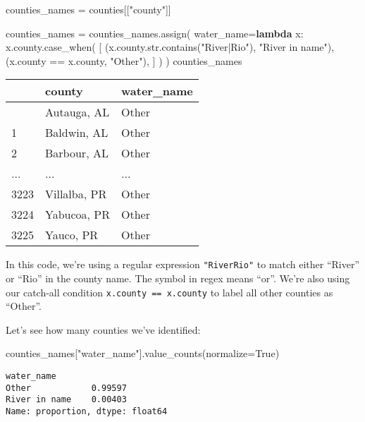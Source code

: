 \documentclass[
  letterpaper,
  DIV=11,
  numbers=noendperiod]{scrreprt}
\newenvironment{Shaded}{\begin{snugshade}}{\end{snugshade}}
\newcommand{\BuiltInTok}[1]{\textcolor[rgb]{0.00,0.23,0.31}{#1}}
\newcommand{\KeywordTok}[1]{\textcolor[rgb]{0.00,0.23,0.31}{\textbf{#1}}}
\newcommand{\NormalTok}[1]{\textcolor[rgb]{0.00,0.23,0.31}{#1}}
\newcommand{\OperatorTok}[1]{\textcolor[rgb]{0.37,0.37,0.37}{#1}}
\newcommand{\StringTok}[1]{\textcolor[rgb]{0.13,0.47,0.30}{#1}}
\newcommand{\VariableTok}[1]{\textcolor[rgb]{0.07,0.07,0.07}{#1}}
\begin{document}
\begin{Shaded}
\begin{Highlighting}[]
\NormalTok{counties\_names }\OperatorTok{=}\NormalTok{ counties[[}\StringTok{"county"}\NormalTok{]]}

\NormalTok{counties\_names }\OperatorTok{=}\NormalTok{ counties\_names.assign(}
\NormalTok{    water\_name}\OperatorTok{=}\KeywordTok{lambda}\NormalTok{ x: x.county.case\_when(}
\NormalTok{        [}
\NormalTok{            (x.county.}\BuiltInTok{str}\NormalTok{.contains(}\StringTok{"River|Rio"}\NormalTok{), }\StringTok{"River in name"}\NormalTok{),}
\NormalTok{            (x.county }\OperatorTok{==}\NormalTok{ x.county, }\StringTok{"Other"}\NormalTok{),}
\NormalTok{        ]}
\NormalTok{    )}
\NormalTok{)}
\NormalTok{counties\_names}
\end{Highlighting}
\end{Shaded}

\begin{longtable}[]{@{}lll@{}}
\toprule\noalign{}
& county & water\_name \\
\midrule\noalign{}
\endhead
\bottomrule\noalign{}
\endlastfoot
0 & Autauga, AL & Other \\
1 & Baldwin, AL & Other \\
2 & Barbour, AL & Other \\
... & ... & ... \\
3223 & Villalba, PR & Other \\
3224 & Yabucoa, PR & Other \\
3225 & Yauco, PR & Other \\
\end{longtable}

In this code, we're using a regular expression
\texttt{"River\textbar{}Rio"} to match either ``River'' or ``Rio'' in
the county name. The \texttt{\textbar{}} symbol in regex means ``or''.
We're also using our catch-all condition \texttt{x.county\ ==\ x.county}
to label all other counties as ``Other''.

Let's see how many counties we've identified:

\begin{Shaded}
\begin{Highlighting}[]
\NormalTok{counties\_names[}\StringTok{"water\_name"}\NormalTok{].value\_counts(normalize}\OperatorTok{=}\VariableTok{True}\NormalTok{)}
\end{Highlighting}
\end{Shaded}

\begin{verbatim}
water_name
Other            0.99597
River in name    0.00403
Name: proportion, dtype: float64
\end{verbatim}
\end{document}

